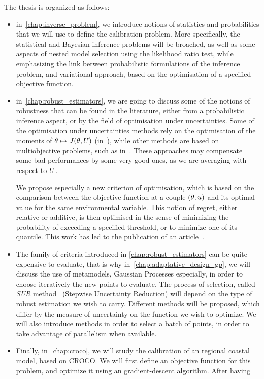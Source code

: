\documentclass[../../Main_ManuscritThese.tex]{subfiles}
\begin{document}

The thesis is organized as follows:
\begin{itemize}
\item in~\cref{chap:inverse_problem}, we introduce notions of
  statistics and probabilities that we will use to define the
  calibration problem. More specifically, the statistical and Bayesian
  inference problems will be broached, as well as some aspects of
  nested model selection using the likelihood ratio test, while
  emphasizing the link between probabilistic formulations of the
  inference problem, and variational approach, based on the
  optimisation of a specified objective function.
\item in~\cref{chap:robust_estimators}, we are going to discuss some
  of the notions of robustness that can be found in the literature,
  either from a probabilistic inference aspect, or by the field of
  optimisation under uncertainties.  Some of the optimisation under
  uncertainties methods rely on the optimisation of the moments of
  $ \theta\mapsto J(\theta,U)$
  (in~\cite{lehman_designing_2004,janusevskis_simultaneous_2010}),
  while other methods are based on multiobjective problems, such as
  in~\cite{baudoui_optimisation_2012,ribaud_krigeage_2018}. These
  approaches may compensate some bad performances by some very good
  ones, as we are averaging with respect to $U$.

  We propose especially a new criterion of optimisation, which is
  based on the comparison between the objective function at a couple
  $(\theta,u)$ and its optimal value for the same environmental
  variable. This notion of regret, either relative or additive, is
  then optimised in the sense of minimizing the probability of
  exceeding a specified threshold, or to minimize one of its
  quantile. This work has led to the publication of an
  article~\cite{trappler_robust_2020}.
  
\item The family of criteria introduced in
  \cref{chap:robust_estimators} can be quite expensive to evaluate,
  that is why in~\cref{chap:adaptative_design_gp}, we will discuss the
  use of metamodels, Gaussian Processes especially, in order to choose
  iteratively the new points to evaluate. The process of selection,
  called \emph{SUR} method~\cite{bect_sequential_2012} (Stepwise
  Uncertainty Reduction) will depend on the type of robust estimation
  we wish to carry. Different methods will be proposed, which differ
  by the measure of uncertainty on the function we wish to
  optimize. We will also introduce methods in order to select a batch
  of points, in order to take advantage of parallelism when available.

\item Finally, in~\cref{chap:croco}, we will study the calibration of
  an regional coastal model, based on CROCO\@. We will first define an
  objective function for this problem, and optimize it using an
  gradient-descent algorithm. After having 
\end{itemize}
\end{document}
